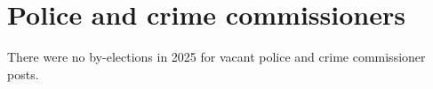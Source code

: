 \documentclass[a4paper,openany]{book}
\begin{document}
%
%

\section{Police and crime commissioners}

There were no by-elections in 2025 for vacant police and crime commissioner posts.
\end{document}
